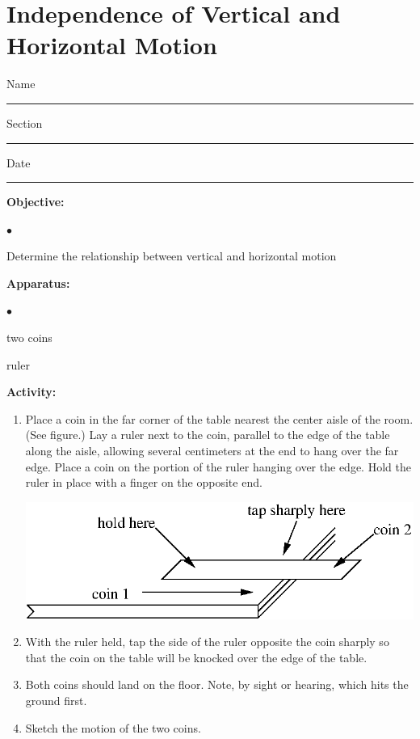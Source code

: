 
\section{Independence of Vertical and Horizontal Motion}

Name \rule{2.0in}{0.1pt}\hfill{}Section \rule{1.0in}{0.1pt}\hfill{}Date \rule{1.0in}{0.1pt}

{\noindent \bf Objective:} \begin{list}{$\bullet$}{\itemsep0pt }

\item Determine the relationship between vertical and horizontal motion

\end{list}

{\noindent \bf Apparatus:} \begin{list}{$\bullet$}{\itemsep0pt }

\item two coins \item ruler

\end{list}

{\noindent \bf Activity:} \begin{enumerate}

\item Place a coin in the far corner of the table nearest the center aisle of the room. (See figure.) Lay a ruler next to the coin, parallel to the edge of the table along the aisle, allowing several centimeters at the end to hang over the far edge. Place a coin on the portion of the ruler hanging over the edge. Hold the ruler in place with a finger on the opposite end.

\vspace{0.3cm}
{\par\centering \includegraphics{independence/independence_fig1.eps} \par}
\vspace{0.3cm}

\item With the ruler held, tap the side of the ruler opposite the coin sharply so that the coin on the table will be knocked over the edge of the table.

\item Both coins should land on the floor. Note, by sight or hearing, which hits the ground first.

\item Sketch the motion of the two coins.

\end{enumerate}

